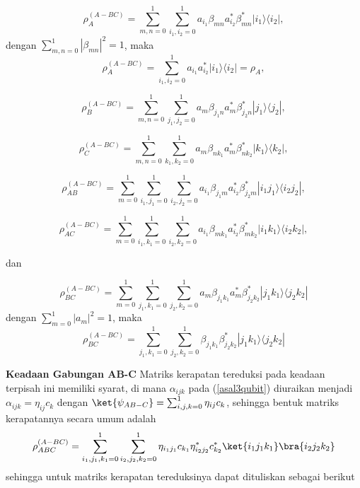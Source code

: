 \begin{equation}
\rho_{A}^{(A-BC)} = \sum_{m,n=0}^{1} \sum_{i_1,i_2=0}^{1} a_{i_1}\beta_{mn} a^{*}_{i_2}\beta^{*}_{mn}|i_1\rangle \langle i_2|,
\end{equation}
dengan $\sum_{m,n=0}^{1}|\beta_{mn}|^2=1$, maka
\begin{equation}
	\rho_{A}^{(A-BC)} = \sum_{i_1,i_2=0}^{1} a_{i_1} a^{*}_{i_2}|i_1\rangle \langle i_2|=\rho_A,
\end{equation}

\begin{equation}
\rho_{B}^{(A-BC)} = \sum_{m,n=0}^{1} \sum_{j_1,j_2=0}^{1}a_m\beta_{j_1 n}a^{*}_m\beta^{*}_{j_2 n}|j_1\rangle \langle j_2|,
\end{equation}

\begin{equation}
\rho_{C}^{(A-BC)} = \sum_{m,n=0}^{1} \sum_{k_1,k_2=0}^{1}a_m\beta_{n k_1}a^{*}_m\beta^{*}_{n k_2}|k_1\rangle \langle k_2|,
\end{equation}

\begin{equation}
\rho_{AB}^{(A-BC)} = \sum_{m=0}^{1} \sum_{i_1,j_1=0}^{1}\sum_{i_2,j_2=0}^{1} a_{i_1}\beta_{j_1 m} a^{*}_{i_2}\beta^{*}_{j_2 m}|i_1 j_1\rangle \langle i_2 j_2|,
\end{equation}

\begin{equation}
\rho_{AC}^{(A-BC)} = \sum_{m=0}^{1} \sum_{i_1,k_1=0}^{1}\sum_{i_2,k_2=0}^{1} a_{i_1}\beta_{m k_1} a^{*}_{i_2}\beta^{*}_{m k_2}|i_1 k_1\rangle \langle i_2 k_2|,
\end{equation}

dan

\begin{equation}
\rho_{BC}^{(A-BC)} = \sum_{m=0}^{1} \sum_{j_1,k_1=0}^{1}\sum_{j_2,k_2=0}^{1}a_m\beta_{j_1k_1}a^{*}_m\beta^{*}_{j_2k_2}|j_1 k_1\rangle \langle j_2 k_2|
\end{equation}
dengan $\sum_{m=0}^{1}|a_m|^2=1$, maka
\begin{equation}
	\rho_{BC}^{(A-BC)} = \sum_{j_1,k_1=0}^{1}\sum_{j_2,k_2=0}^{1}\beta_{j_1k_1}\beta^{*}_{j_2k_2}|j_1 k_1\rangle \langle j_2 k_2|
\end{equation}

\textbf{Keadaan Gabungan AB-C}
Matriks kerapatan tereduksi pada keadaan terpisah ini memiliki syarat, di mana $\alpha_{ijk}$ pada (\ref{asal3qubit}) diuraikan menjadi $\alpha_{ijk}=\eta_{ij} c_k$ dengan $\ket{\psi_{AB-C}}=\sum_{i,j,k=0}^1 \eta_{ij} c_k$, sehingga bentuk matriks kerapatannya secara umum adalah
\begin{equation}
    \rho_{ABC}^{(A-BC)}=\sum_{i_1,j_1,k_1=0}^1\sum_{i_2,j_2,k_2=0}^1 \eta_{i_1j_1} c_{k_1}\eta^{*}_{i_2j_2} c^{*}_{k_2}\ket{i_1j_1k_1}\bra{i_2j_2k_2}
\end{equation}
sehingga untuk matriks kerapatan tereduksinya dapat dituliskan sebagai berikut

